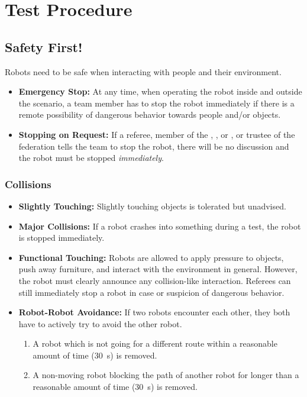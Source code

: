 \section{Test Procedure}
\label{sec:rules:testprocedure}

\subsection{Safety First!}
\label{sec:rules:safetyfirst}
Robots need to be safe when interacting with people and their environment.
\begin{itemize}
	\item \textbf{Emergency Stop:} At any time, when operating the robot inside and outside the scenario, a team member has to stop the robot immediately if there is a remote possibility of dangerous behavior towards people and/or objects.
	\item \textbf{Stopping on Request:} If a referee, member of the , , or , or trustee of the federation tells the team to stop the robot, there will be no discussion and the robot must be stopped \emph{immediately}.
\end{itemize}

\subsubsection{Collisions}
\label{sec:rules:collisions}
\begin{itemize}
	\item \textbf{Slightly Touching:} Slightly touching objects is tolerated but unadvised.

	\item \textbf{Major Collisions:} If a robot crashes into something during a test, the robot is stopped immediately.

	\item \textbf{Functional Touching:} Robots are allowed to apply pressure to objects, push away furniture, and interact with the environment in general. However, the robot must clearly announce any collision-like interaction. Referees can still immediately stop a robot in case or suspicion of dangerous behavior.

	\item \textbf{Robot-Robot Avoidance:} If two robots encounter each other, they both have to actively try to avoid the other robot.
	\begin{enumerate}
		\item A robot which is not going for a different route within a reasonable amount of time (\SI{30}{\second}) is removed.
		\item A non-moving robot blocking the path of another robot for longer than a reasonable amount of time (\SI{30}{\second}) is removed.
	\end{enumerate}
\end{itemize}

